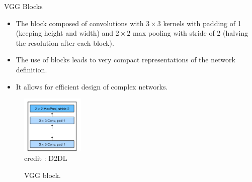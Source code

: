 \begin{vbframe}{VGG Blocks}
  \begin{itemize}
    \item The block composed of convolutions with $3 \times 3$  kernels with padding of 1 (keeping height and width) and $2 \times 2$  max pooling with stride of 2 (halving the resolution after each block).
    \item The use of blocks leads to very compact representations of the network definition. 
    \item It allows for efficient design of complex networks.
  \end{itemize}
  
    \begin{figure}
  \centering
    \includegraphics[width=3cm]{plots/moderncnn/vggblock.png}
    \tiny{\\ credit : D2DL}
    \caption{VGG block.}
  \end{figure}
  
\end{vbframe}



